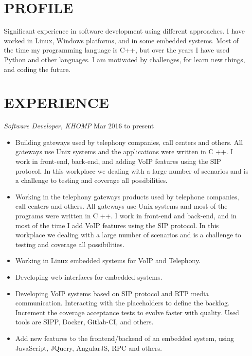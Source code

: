 \documentclass[line,margin]{res}
\begin{document}
\address{alvarofleith@gmail.com or +64 (09) 889-3534}
\address{https://linkedin.com/in/alvarofleith}


\begin{resume}

\section{PROFILE}       Significant experience in software development using different approaches. I have worked in Linux, Windows platforms, and in some embedded systems. Most of the time my programming language is C++, but over the years I have used Python and other languages. I am motivated by challenges, for learn new things, and coding the future.


 \section{EXPERIENCE} {\sl Software Developer, KHOMP} \hfill Mar 2016 to present \\
                 \begin{itemize}  \itemsep -2pt
                 \item Building gateways used by telephony companies, call centers and others. All gateways use Unix systems and the applications were written in C ++. I work in front-end, back-end, and adding VoIP features using the SIP protocol. In this workplace we dealing with a large number of scenarios and is a challenge to testing and coverage all possibilities.
                 \item Working in the telephony gateways products used by telephone companies, call centers and others. All gateways use Unix systems and most of the programs were written in C ++. I work in front-end and back-end, and in most of the time I add VoIP features using the SIP protocol. In this workplace we dealing with a large number of scenarios and is a challenge to testing and coverage all possibilities.
                 \item Working in Linux embedded systems for VoIP and Telephony.
                 \item Developing web interfaces for embedded systems.
                 \item Developing VoIP systems based on SIP protocol and RTP media communication. Interacting with the placeholders to define the backlog. Increment the coverage acceptance tests to evolve faster with quality. Used tools are SIPP, Docker, Gitlab-CI, and others.
                 \item Add new features to the frontend/backend of an embedded system, using JavaScript, JQuery, AngularJS, RPC and others.
                \end{itemize}


\end{resume}
\end{document}
